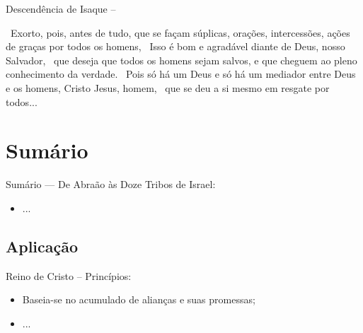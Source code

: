\documentclass[12pt,aspectratio=169]{beamer}
\newcommand{\ver}[1]{%
    \raisebox{0.50ex}{%
        \scalebox{1.1}{%
            \pmb{\textbf{\textcolor{BSpbg}{#1}}}%
        }%
    }%
}
\newcommand{\QUOTE}[1]{%
    \par\noindent\hspace*{0.05\linewidth}%
    \begin{minipage}{0.9\linewidth}%
        \linespread{1.35}\large{#1}%
    \end{minipage}%
}
\newcommand{\ORA}[1]{{\textcolor{TXred!50!TXyel}{#1}}}
\newcommand{\YEL}[1]{{\textcolor{TXyel}{#1}}}
\newcommand{\GRE}[1]{{\textcolor{TXgre}{#1}}}
\begin{document}
\begin{frame}[allowframebreaks]{Descendência de \YEL{Isaque} --}
        \pagebreak

        \QUOTE{%
            \ver{1Tm 2.1}~Exorto, pois, antes de tudo, que se façam súplicas, orações,
            intercessões, ações de graças por \GRE{todos os homens},
            \ver{3}~Isso é \YEL{bom e agradável diante de Deus}, nosso Salvador,
            \ver{4}~que \GRE{deseja que todos os homens sejam salvos, e que cheguem ao pleno
            conhecimento da verdade}.
            \ver{5}~Pois só há um Deus e só há um mediador entre Deus e os homens, Cristo Jesus,
            homem,
            \ver{6}~que se deu a si mesmo em \GRE{resgate por todos}...
        }
    \end{frame}

\section{Sumário}

    \begin{frame}
        \par\noindent\hspace*{0.05\linewidth}%
        \begin{minipage}{0.9\linewidth}%
            \large%
            \begin{alertblock}{Sumário --- De Abraão às Doze Tribos de Israel:}
                \normalsize
                \begin{itemize}
					\item<1-> ...
                \end{itemize}
            \end{alertblock}
        \end{minipage}%
    \end{frame}

    \subsection{Aplicação}

    \begin{frame}{\YEL{Reino de Cristo} -- Princípios:}
        \begin{itemize}
            \item<1-> Baseia-se no \YEL{acumulado} de \GRE{alianças} e suas \ORA{promessas};
            \item<1-> ...
        \end{itemize}
    \end{frame}

\end{document}
